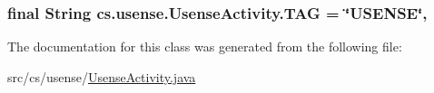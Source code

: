 \subsubsection[{T\+A\+G}]{\setlength{\rightskip}{0pt plus 5cm}final String cs.\+usense.\+Usense\+Activity.\+T\+A\+G = \char`\"{}U\+S\+E\+N\+S\+E\char`\"{}\hspace{0.3cm}{\ttfamily [static]}, {\ttfamily [private]}}\label{classcs_1_1usense_1_1_usense_activity_a9a9e8dd0e952822c0ba0f4f210e7bc4c}


The documentation for this class was generated from the following file\+:\begin{DoxyCompactItemize}
\item 
src/cs/usense/\hyperlink{_usense_activity_8java}{Usense\+Activity.\+java}\end{DoxyCompactItemize}
